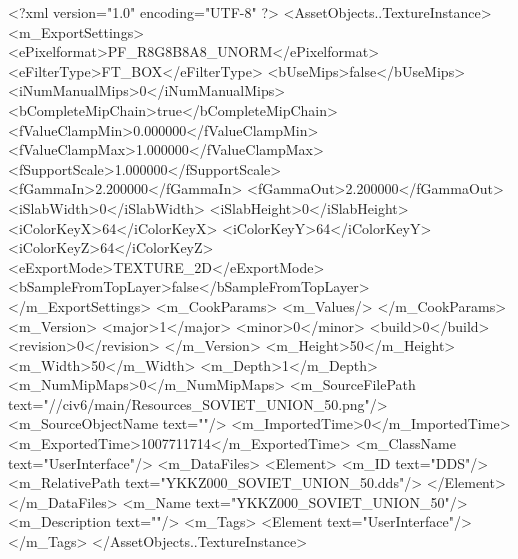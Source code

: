 <?xml version="1.0" encoding="UTF-8" ?>
<AssetObjects..TextureInstance>
	<m_ExportSettings>
		<ePixelformat>PF_R8G8B8A8_UNORM</ePixelformat>
		<eFilterType>FT_BOX</eFilterType>
		<bUseMips>false</bUseMips>
		<iNumManualMips>0</iNumManualMips>
		<bCompleteMipChain>true</bCompleteMipChain>
		<fValueClampMin>0.000000</fValueClampMin>
		<fValueClampMax>1.000000</fValueClampMax>
		<fSupportScale>1.000000</fSupportScale>
		<fGammaIn>2.200000</fGammaIn>
		<fGammaOut>2.200000</fGammaOut>
		<iSlabWidth>0</iSlabWidth>
		<iSlabHeight>0</iSlabHeight>
		<iColorKeyX>64</iColorKeyX>
		<iColorKeyY>64</iColorKeyY>
		<iColorKeyZ>64</iColorKeyZ>
		<eExportMode>TEXTURE_2D</eExportMode>
		<bSampleFromTopLayer>false</bSampleFromTopLayer>
	</m_ExportSettings>
	<m_CookParams>
		<m_Values/>
	</m_CookParams>
	<m_Version>
		<major>1</major>
		<minor>0</minor>
		<build>0</build>
		<revision>0</revision>
	</m_Version>
	<m_Height>50</m_Height>
	<m_Width>50</m_Width>
	<m_Depth>1</m_Depth>
	<m_NumMipMaps>0</m_NumMipMaps>
	<m_SourceFilePath text="//civ6/main/Resources_SOVIET_UNION_50.png"/>
	<m_SourceObjectName text=""/>
	<m_ImportedTime>0</m_ImportedTime>
	<m_ExportedTime>1007711714</m_ExportedTime>
	<m_ClassName text="UserInterface"/>
	<m_DataFiles>
		<Element>
			<m_ID text="DDS"/>
			<m_RelativePath text="YKKZ000_SOVIET_UNION_50.dds"/>
		</Element>
	</m_DataFiles>
	<m_Name text="YKKZ000_SOVIET_UNION_50"/>
	<m_Description text=""/>
	<m_Tags>
		<Element text="UserInterface"/>
	</m_Tags>
</AssetObjects..TextureInstance>

